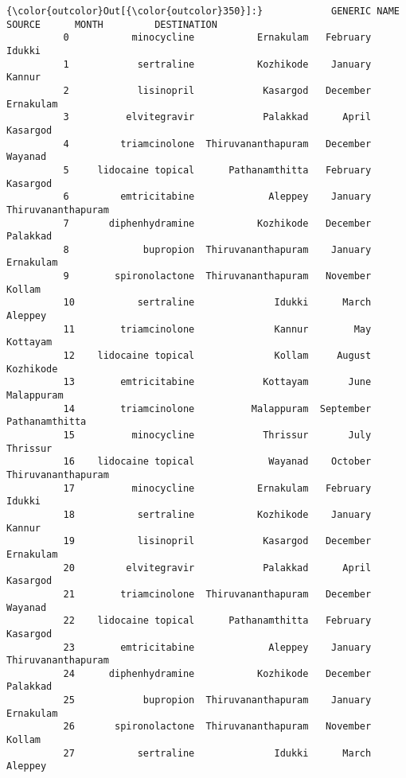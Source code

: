 \documentclass[11pt]{article}
\begin{document}
\begin{Verbatim}[commandchars=\\\{\}]
{\color{outcolor}Out[{\color{outcolor}350}]:}            GENERIC NAME              SOURCE      MONTH         DESTINATION
          0           minocycline           Ernakulam   February              Idukki
          1            sertraline           Kozhikode    January              Kannur
          2            lisinopril            Kasargod   December           Ernakulam
          3          elvitegravir            Palakkad      April            Kasargod
          4         triamcinolone  Thiruvananthapuram   December             Wayanad
          5     lidocaine topical      Pathanamthitta   February            Kasargod
          6         emtricitabine             Aleppey    January  Thiruvananthapuram
          7       diphenhydramine           Kozhikode   December            Palakkad
          8             bupropion  Thiruvananthapuram    January           Ernakulam
          9        spironolactone  Thiruvananthapuram   November              Kollam
          10           sertraline              Idukki      March             Aleppey
          11        triamcinolone              Kannur        May            Kottayam
          12    lidocaine topical              Kollam     August           Kozhikode
          13        emtricitabine            Kottayam       June          Malappuram
          14        triamcinolone          Malappuram  September      Pathanamthitta
          15          minocycline            Thrissur       July            Thrissur
          16    lidocaine topical             Wayanad    October  Thiruvananthapuram
          17          minocycline           Ernakulam   February              Idukki
          18           sertraline           Kozhikode    January              Kannur
          19           lisinopril            Kasargod   December           Ernakulam
          20         elvitegravir            Palakkad      April            Kasargod
          21        triamcinolone  Thiruvananthapuram   December             Wayanad
          22    lidocaine topical      Pathanamthitta   February            Kasargod
          23        emtricitabine             Aleppey    January  Thiruvananthapuram
          24      diphenhydramine           Kozhikode   December            Palakkad
          25            bupropion  Thiruvananthapuram    January           Ernakulam
          26       spironolactone  Thiruvananthapuram   November              Kollam
          27           sertraline              Idukki      March             Aleppey

\end{Verbatim}
\end{document}
